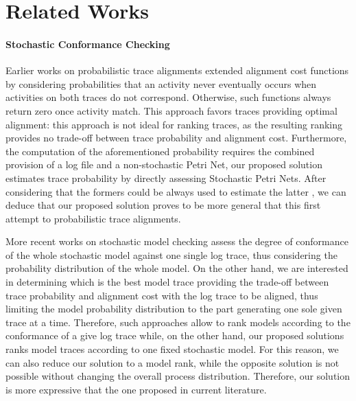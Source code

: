 \section{Related Works}
\paragraph*{Stochastic Conformance Checking} Earlier works on probabilistic trace alignments \cite{AlizadehLZ14a} extended alignment cost functions by considering probabilities that an activity never eventually occurs when activities on both traces do not correspond. Otherwise, such functions always return zero once activity match. This approach favors traces providing optimal alignment: this approach is not ideal for ranking traces, as the resulting ranking provides no trade-off between trace probability and alignment cost. Furthermore, the computation of the aforementioned probability requires the combined provision of a log file and a non-stochastic Petri Net, our proposed solution estimates trace probability by directly assessing Stochastic Petri Nets. After considering that the formers could be always used to estimate the latter \cite{spdwe}, we can deduce that our proposed solution proves to be more general that this first attempt to probabilistic trace alignments. 

More recent works on stochastic model checking \cite{DBLP:conf/icpm/PolyvyanyyK19,DBLP:journals/tosem/PolyvyanyySWCM20} assess the degree of conformance of the whole stochastic model against one single log trace, thus considering the probability distribution of the whole model. On the other hand, we are interested in determining which is the best model trace providing the trade-off between trace probability and alignment cost with the log trace to be aligned, thus limiting the model probability distribution to the part generating one sole given trace at a time. Therefore, such approaches allow to rank models according to the conformance of a give log trace while, on the other hand, our proposed solutions ranks model traces according to one fixed stochastic model. For this reason, we can also reduce our solution to a model rank, while the opposite solution is not possible without changing the overall process distribution. Therefore, our solution is more expressive that the one proposed in current literature.

 
